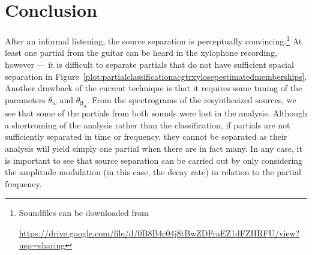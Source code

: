 \section{Conclusion}

After an informal listening, the source separation is perceptually
convincing.\footnote{Soundfiles can be downloaded from \par
\url{https://drive.google.com/file/d/0B8B4c04j8tBwZDFraEZ1dFZHRFU/view?usp=sharing}}
At least one partial from the guitar can be heard in the xylophone recording,
however --- it is difficult to separate partials that do not have sufficient
spacial separation in
Figure~\ref{plot:partialclassificationacgtrxylosepestimatedmemberships}. Another
drawback of the current technique is that it requires some tuning of the
parameters $\theta_{w}$ and $\theta_{\boldsymbol{\beta}_{\boldsymbol{a}}}$.
From the spectrograms of the resynthesized sources, we see that some of the
partials from both sounds were lost in the analysis.  Although a shortcoming of
the analysis rather than the classification, if partials are not sufficiently
separated in time or frequency, they cannot be separated as their analysis will
yield simply one partial when there are in fact many. In any case, it is important
to see that source separation can be carried out by only considering the
amplitude modulation (in this case, the decay rate) in relation to the partial
frequency.
